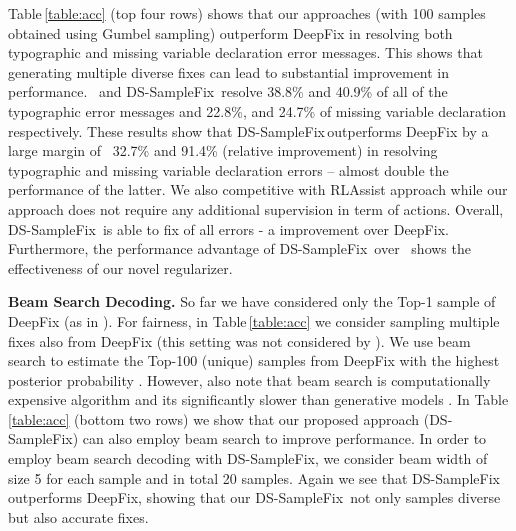 \documentclass[letterpaper]{article} \usepackage{aaai20}  \usepackage{times}  \usepackage{helvet} \usepackage{courier}  \usepackage[hyphens]{url}  \usepackage{graphicx}
\newcommand{\dssmaplefix}{DS-SampleFix}
\newcommand{\tableref}{Table}
\newcommand{\myparagraph}[1]{\vspace{0.0em}\noindent\textbf{#1.}}
\begin{document}
\tableref \,\ref{table:acc} (top four rows) shows that our approaches (with 100 samples obtained using Gumbel sampling) outperform DeepFix in resolving both typographic and missing variable declaration error messages. This shows that generating multiple diverse fixes can lead to substantial improvement in performance. \samplefix \, and \dssmaplefix \, resolve 38.8\% and 40.9\% of all of the typographic error messages and 22.8\%, and 24.7\% of missing variable declaration respectively. These results show that \dssmaplefix \,outperforms DeepFix by a large margin of \
32.7\% and 91.4\% (relative improvement) in resolving typographic and missing variable declaration errors -- almost double the performance of the latter. We also competitive with RLAssist approach while our approach does not require any additional supervision in term of actions. Overall, \dssmaplefix \, is able to fix  of all errors - a  improvement over DeepFix. Furthermore, the performance advantage of \dssmaplefix \, over \samplefix \, shows the effectiveness of our novel regularizer.

\myparagraph{Beam Search Decoding} 
So far we have considered only the Top-1 sample of DeepFix (as in \cite{Gupta2017DeepFixFC}). For fairness, in \tableref \,\ref{table:acc} we consider sampling multiple fixes also from DeepFix (this setting was not considered by \cite{Gupta2017DeepFixFC}). We use beam search to estimate the Top-100 (unique) samples from DeepFix with the highest posterior probability \cite{deshpande2019fast}. However, also note that beam search is computationally expensive algorithm and its significantly slower than generative models \cite{deshpande2019fast}. In \tableref \,\ref{table:acc} (bottom two rows) we show that our proposed approach (\dssmaplefix) can also employ beam search to improve performance. In order to employ beam search decoding with \dssmaplefix , we consider beam width of size 5 for each sample  and in total 20  samples. Again we see that \dssmaplefix \, outperforms DeepFix, showing that our \dssmaplefix \, not only samples diverse but also accurate fixes.
\end{document}
